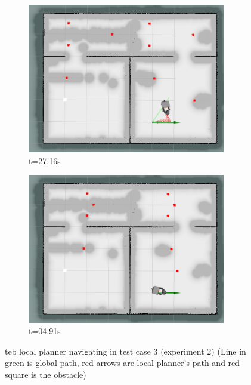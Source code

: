 \begin{figure}[!ht]
\begin{subfigure}[b]{0.35\linewidth}
    \end{subfigure}%
    \begin{subfigure}[b]{0.35\linewidth}
        \centering
        \includegraphics[width=0.95\textwidth]{images/teb_double/2/3466.png} \caption{t=27.16s}
    \end{subfigure}%
    \begin{subfigure}[b]{0.35\linewidth}
        \centering
        \includegraphics[width=0.95\textwidth]{images/teb_double/2/3711.png} \caption{t=04.91s}
    \end{subfigure}
    \caption{teb local planner navigating in test case 3 (experiment 2) (Line in green is
    global path, red arrows are local planner's path and red square is the obstacle)}\label{fig:teb_test_case_3_exp_2}
\end{figure}

